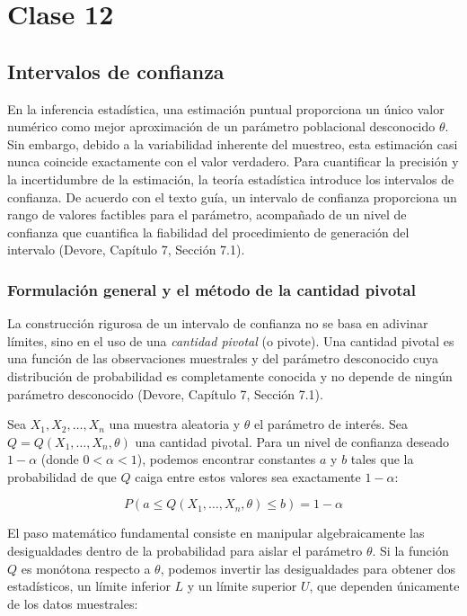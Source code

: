 \chapter{Clase 12}

\section{Intervalos de confianza}

En la inferencia estadística, una estimación puntual proporciona un único valor numérico como mejor aproximación de un parámetro poblacional desconocido $\theta$. Sin embargo, debido a la variabilidad inherente del muestreo, esta estimación casi nunca coincide exactamente con el valor verdadero. Para cuantificar la precisión y la incertidumbre de la estimación, la teoría estadística introduce los intervalos de confianza. De acuerdo con el texto guía, un intervalo de confianza proporciona un rango de valores factibles para el parámetro, acompañado de un nivel de confianza que cuantifica la fiabilidad del procedimiento de generación del intervalo (Devore, Capítulo 7, Sección 7.1).

\subsection{Formulación general y el método de la cantidad pivotal}

La construcción rigurosa de un intervalo de confianza no se basa en adivinar límites, sino en el uso de una \textit{cantidad pivotal} (o pivote). Una cantidad pivotal es una función de las observaciones muestrales y del parámetro desconocido cuya distribución de probabilidad es completamente conocida y no depende de ningún parámetro desconocido (Devore, Capítulo 7, Sección 7.1).

Sea $X_1, X_2, \dots, X_n$ una muestra aleatoria y $\theta$ el parámetro de interés. Sea $Q = Q(X_1, \dots, X_n, \theta)$ una cantidad pivotal. Para un nivel de confianza deseado $1 - \alpha$ (donde $0 < \alpha < 1$), podemos encontrar constantes $a$ y $b$ tales que la probabilidad de que $Q$ caiga entre estos valores sea exactamente $1 - \alpha$:

$$ P(a \le Q(X_1, \dots, X_n, \theta) \le b) = 1 - \alpha $$

El paso matemático fundamental consiste en manipular algebraicamente las desigualdades dentro de la probabilidad para aislar el parámetro $\theta$. Si la función $Q$ es monótona respecto a $\theta$, podemos invertir las desigualdades para obtener dos estadísticos, un límite inferior $L$ y un límite superior $U$, que dependen únicamente de los datos muestrales:

